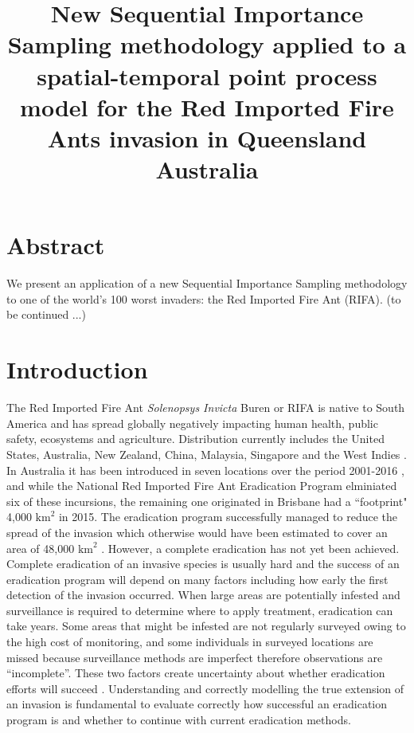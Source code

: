 \documentclass[11pt,a4paper]{article}
\title{New Sequential Importance Sampling methodology applied to a spatial-temporal point process model for the Red Imported Fire Ants invasion in Queensland Australia}
\begin{document}
\maketitle
{\color{red}
\section{Abstract}\label{section:abstract}
We present an application of a new Sequential Importance Sampling methodology to one of the world's 100 worst invaders: the Red Imported Fire Ant (RIFA). (to be continued ...)}

{\color{red}
\section{Introduction}\label{section:introduction}
The Red Imported Fire Ant \textit{Solenopsys Invicta} Buren \cite{GISD} or RIFA is native to South America and has spread globally \cite{Wetterer} negatively impacting human health, public safety, ecosystems and agriculture. Distribution currently includes the United States, Australia, New Zealand, China, Malaysia, Singapore and the West Indies \cite{Wang} \cite{GISD}. In Australia it has been introduced in seven locations over the period 2001-2016 \cite{WylieMay16}, and while the National Red Imported Fire Ant Eradication Program elminiated six of these incursions, the remaining one originated in Brisbane had a ``footprint" 4,000 $\text{km}^2$ in 2015. The eradication program successfully managed to reduce the spread of the invasion which otherwise would have been estimated to cover an area of 48,000 $\text{km}^2$ \cite{Wylie2020}. However, a complete eradication has not yet been achieved. Complete eradication of an invasive species is usually hard and the success of an eradication program will depend on many factors including how early the first detection of the invasion occurred. When large areas are potentially infested and surveillance is required to determine where to apply treatment, eradication can take years. Some areas that might be infested are not regularly surveyed owing to the high cost of monitoring, and some individuals in surveyed locations are missed because surveillance methods are imperfect \cite{Royle} therefore observations are “incomplete”. These two factors create uncertainty about whether eradication efforts will succeed  \cite{Keith}. Understanding and correctly modelling the true extension of an invasion is fundamental to evaluate correctly how successful an eradication program is and whether to continue with current eradication methods. 

}
\end{document}
